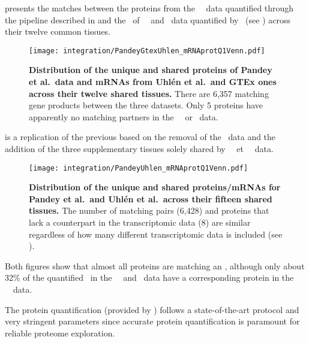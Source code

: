  presents the matches between
the proteins from the \pandey\ \etal\ data
quantified through the pipeline described in 
and the \mRNAs\ of \uhlen\ \etal\ and \gtex\ data quantified by \htseq\
(see ) across their twelve common tissues.

\begin{figure}[!htb]
    \texttt{[image: integration/PandeyGtexUhlen\_mRNAprotQ1Venn.pdf]}\centering
    \vspace{-5mm}
    \caption[Distribution of the unique and shared proteins/mRNAs for the three datasets
    across twelve tissues]{%
    \label{fig:PGU_vennQ1}\textbf{Distribution of the unique and shared proteins
    of Pandey et al.\ data and mRNAs from Uhlén et al.\ and GTEx ones across
    their twelve shared tissues.}
    There are 6,357 matching gene products between the three datasets.
    Only 5 proteins have apparently no matching partners
    in the \uhlen\ \etal\ or \gtex\ data.}
\end{figure}

 is a replication of the previous 
based on the removal of the \gtex\ data
and the addition of the three supplementary tissues solely shared
by \pandey\ \etal\ et \uhlen\ \etal\ data.%

\begin{figure}[!htb]
    \texttt{[image: integration/PandeyUhlen\_mRNAprotQ1Venn.pdf]}\centering
    \vspace{-3.5mm}
    \caption[Distribution of the unique and shared proteins/mRNAs for Pandey et al.\
    and Uhlén et al.\ across fifteen tissues.]{%
    \label{fig:PU_vennQ1}\textbf{Distribution of the unique and shared proteins/mRNAs
    for Pandey et al.\ and Uhlén et al.\ across their fifteen shared tissues.}
    The number of matching pairs (6,428) and proteins that lack a counterpart in
    the transcriptomic data (8) are similar regardless of how many different
    transcriptomic data is included (see \Cref{fig:PGU_vennQ1}).}
\end{figure}

Both figures show that almost all proteins are matching an \mRNA{},
although only about 32\% of the quantified \mRNAs\
in the \uhlen\ \etal\ and \gtex\ data
have a corresponding protein in the \pandey\ \etal\ data.

The protein quantification (provided by \james) follows
a state-of-the-art protocol and very stringent parameters
since accurate protein quantification is paramount for reliable proteome exploration.

